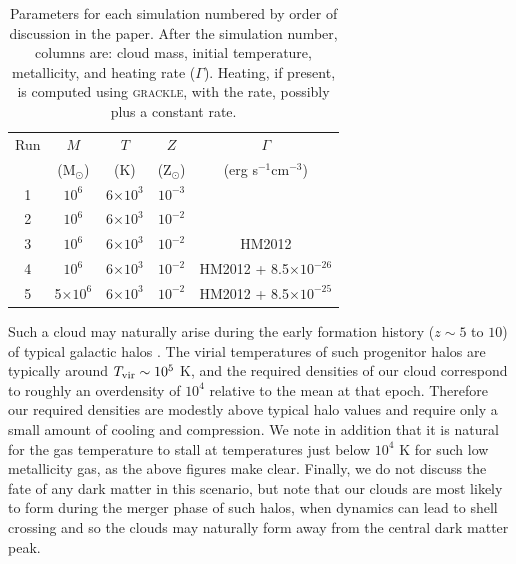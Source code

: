 \documentclass[useAMS,usenatbib]{mn2e}
\begin{document}
\begin{table}
       \begin{center}
	\begin{tabular}{@{}ccccc}
	\hline
	Run & $M$  & $T$ & $Z$  &  $\Gamma$\\ 
          & (M$_{\odot}$) & (K) & (Z$_{\odot}$) & (erg s$^{-1}$cm$^{-3}$)\\ 
	\hline
	    1 & $10^6$ & 6$ \times 10^3$ & $10^{-3}$ &  \\
        2 & $10^6$ & 6$ \times 10^3$ & $10^{-2}$ &  \\
        3 & $10^6$ & 6$ \times 10^3$ & $10^{-2}$ &  HM2012 \\ 
        4 & $10^6$ & 6$ \times 10^3$ & $10^{-2}$ &  HM2012 + 8.5$ \times 10^{-26}$\\ 
        5 & 5$\times 10^6$ & 6$ \times 10^3$ & $10^{-2}$ & HM2012 + 8.5$ \times 10^{-25}$\\ 
       \hline
	\end{tabular}
	\caption{Parameters for each simulation numbered by order of discussion in the paper.  After the simulation number, columns are: cloud mass, initial temperature, metallicity, and heating rate ($\Gamma$).  Heating, if present, is computed using \textsc{grackle}, with the \citet{Haardt2012} rate, possibly plus a constant rate.}
	\label{table:parameters}
	\end{center}
\end{table}

Such a cloud may naturally arise during the early formation history ($z \sim 5$ to $10$)
of typical galactic halos \citep{Kim2017}.  The virial temperatures of such progenitor halos are
typically around $T_{\rm vir} \sim 10^{5}$ K, and the required densities of our cloud
correspond to roughly an overdensity of $10^4$ relative to the mean at that epoch.
Therefore our required densities are modestly above typical halo values and require
only a small amount of cooling and compression.  We note in addition that it is natural for the gas
temperature to stall at temperatures just below $10^4$ K for such low metallicity gas,
as the above figures make clear.  Finally, we do not discuss the fate of any dark matter 
in this scenario, but note that our clouds are most likely to form during the merger
phase of such halos, when dynamics can lead to shell crossing and so the clouds may
naturally form away from the central dark matter peak.
\end{document}
